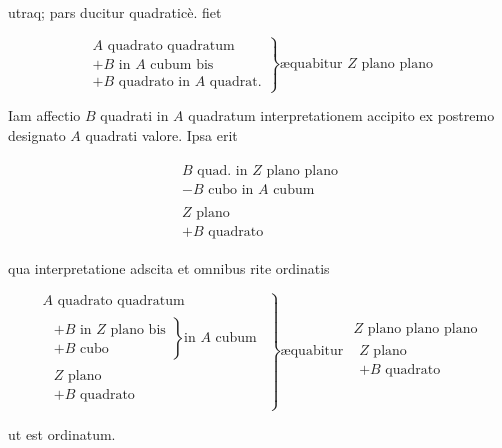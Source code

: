 \documentclass[11pt,a4paper]{article}
\begin{document}
utraq; pars ducitur quadraticè. fiet

\[ \left.\begin{array}{l} A \text{ quadrato quadratum} \\ + B \text{ in } A \text{ cubum bis} \\ + B \text{ quadrato in } A \text{ quadrat.} \end{array}\right\} \text{æquabitur } Z \text{ plano plano} \]

Iam affectio $B$ quadrati in $A$ quadratum interpretationem accipito ex postremo designato $A$ quadrati valore. Ipsa erit

\[ \begin{array}{c} \begin{array}{l} B \text{ quad. in } Z \text{ plano plano} \\ - B \text{ cubo in } A \text{ cubum} \end{array} \\ \hline \begin{array}{l} Z \text{ plano} \\ + B \text{ quadrato} \end{array} \end{array} \]

qua interpretatione adscita et omnibus rite ordinatis

\[ \left.\begin{array}{l} A \text{ quadrato quadratum} \\ \begin{array}{c} \left.\begin{array}{l} + B \text{ in } Z \text{ plano bis} \\ + B \text{ cubo} \end{array}\right\} \text{in } A \text{ cubum} \\ \hline \begin{array}{l} Z \text{ plano} \\ + B \text{ quadrato} \end{array} \end{array} \end{array}\right\} \text{æquabitur } \begin{array}{c} Z \text{ plano plano plano} \\ \hline \begin{array}{l} Z \text{ plano} \\ + B \text{ quadrato} \end{array} \end{array} \]

ut est ordinatum.
\end{document}
